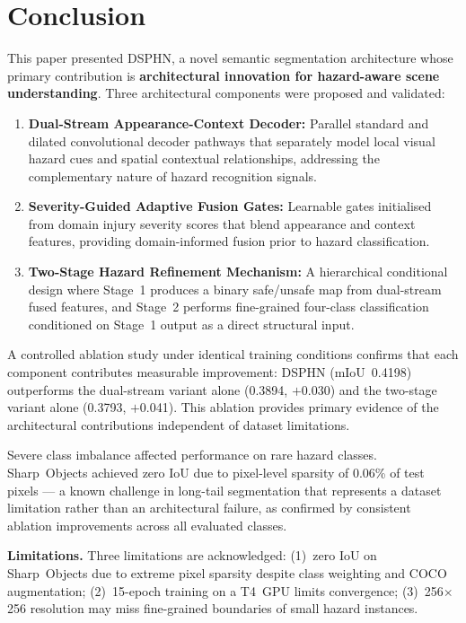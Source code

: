 \section{Conclusion}
\label{sec:conclusion}

This paper presented DSPHN, a novel semantic segmentation architecture
whose primary contribution is \textbf{architectural innovation for
hazard-aware scene understanding}. Three architectural components were
proposed and validated:

\begin{enumerate}
\item \textbf{Dual-Stream Appearance-Context Decoder:} Parallel standard
and dilated convolutional decoder pathways that separately model local
visual hazard cues and spatial contextual relationships, addressing the
complementary nature of hazard recognition signals.

\item \textbf{Severity-Guided Adaptive Fusion Gates:} Learnable gates
initialised from domain injury severity scores that blend appearance
and context features, providing domain-informed fusion prior to
hazard classification.

\item \textbf{Two-Stage Hazard Refinement Mechanism:} A hierarchical
conditional design where Stage~1 produces a binary safe/unsafe map
from dual-stream fused features, and Stage~2 performs fine-grained
four-class classification conditioned on Stage~1 output as a direct
structural input.
\end{enumerate}

A controlled ablation study under identical training conditions
confirms that each component contributes measurable improvement:
DSPHN (mIoU~0.4198) outperforms the dual-stream variant alone
(0.3894, $+$0.030) and the two-stage variant alone (0.3793,
$+$0.041). This ablation provides primary evidence of the
architectural contributions independent of dataset limitations.

Severe class imbalance affected performance on rare hazard classes.
Sharp~Objects achieved zero IoU due to pixel-level sparsity of
0.06\% of test pixels — a known challenge in long-tail segmentation
that represents a dataset limitation rather than an architectural
failure, as confirmed by consistent ablation improvements across
all evaluated classes.

\noindent\textbf{Limitations.}
Three limitations are acknowledged: (1)~zero IoU on Sharp~Objects
due to extreme pixel sparsity despite class weighting and COCO
augmentation; (2)~15-epoch training on a T4~GPU limits convergence;
(3)~256$\times$256 resolution may miss fine-grained boundaries of
small hazard instances.

